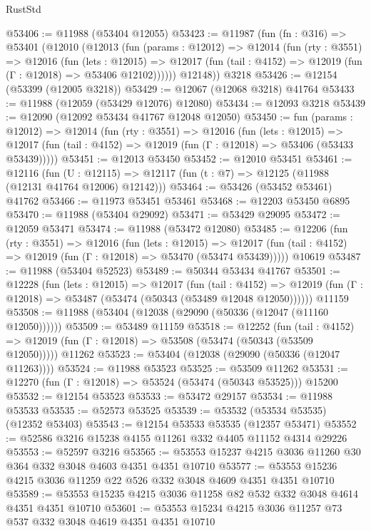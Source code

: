 \begin{lexlean}{RustStd}
\begin{coremodule}
@53406 := @11988 (@53404 @12055)
@53423 := @11987
    (fun (fn : @316) =>
    @53401
      (@12010
        (@12013
          (fun (params : @12012) =>
          @12014
            (fun (rty : @3551) =>
            @12016
              (fun (lets : @12015) =>
              @12017 (fun (tail : @4152) => @12019 (fun (Γ : @12018) => @53406 @12102))))))
        @12148))
    @3218
@53426 := @12154 (@53399 (@12005 @3218))
@53429 := @12067 (@12068 @3218) @41764
@53433 := @11988 (@12059 (@53429 @12076) @12080)
@53434 := @12093 @3218
@53439 := @12090 (@12092 @53434 @41767 @12048 @12050)
@53450 := fun (params : @12012) =>
  @12014
    (fun (rty : @3551) =>
    @12016
      (fun (lets : @12015) =>
      @12017 (fun (tail : @4152) => @12019 (fun (Γ : @12018) => @53406 (@53433 @53439)))))
@53451 := @12013 @53450
@53452 := @12010 @53451
@53461 := @12116
    (fun (U : @12115) => @12117 (fun (t : @7) => @12125 (@11988 (@12131 @41764 @12006) @12142)))
@53464 := @53426 (@53452 @53461) @41762
@53466 := @11973 @53451 @53461
@53468 := @12203 @53450 @6895
@53470 := @11988 (@53404 @29092)
@53471 := @53429 @29095
@53472 := @12059 @53471
@53474 := @11988 (@53472 @12080)
@53485 := @12206
    (fun (rty : @3551) =>
    @12016
      (fun (lets : @12015) =>
      @12017 (fun (tail : @4152) => @12019 (fun (Γ : @12018) => @53470 (@53474 @53439)))))
    @10619
@53487 := @11988 (@53404 @52523)
@53489 := @50344 @53434 @41767
@53501 := @12228
    (fun (lets : @12015) =>
    @12017
      (fun (tail : @4152) =>
      @12019 (fun (Γ : @12018) => @53487 (@53474 (@50343 (@53489 @12048 @12050))))))
    @11159
@53508 := @11988 (@53404 (@12038 (@29090 (@50336 (@12047 (@11160 @12050))))))
@53509 := @53489 @11159
@53518 := @12252
    (fun (tail : @4152) => @12019 (fun (Γ : @12018) => @53508 (@53474 (@50343 (@53509 @12050)))))
    @11262
@53523 := @53404 (@12038 (@29090 (@50336 (@12047 @11263))))
@53524 := @11988 @53523
@53525 := @53509 @11262
@53531 := @12270 (fun (Γ : @12018) => @53524 (@53474 (@50343 @53525))) @15200
@53532 := @12154 @53523
@53533 := @53472 @29157
@53534 := @11988 @53533
@53535 := @52573 @53525
@53539 := @53532 (@53534 @53535) (@12352 @53403)
@53543 := @12154 @53533 @53535 (@12357 @53471)
@53552 := @52586 @3216 @15238 @4155 @11261 @332 @4405 @11152 @4314 @29226
@53553 := @52597 @3216
@53565 := @53553 @15237 @4215 @3036 @11260 @30 @364 @332 @3048 @4603 @4351 @4351 @10710
@53577 := @53553 @15236 @4215 @3036 @11259 @22 @526 @332 @3048 @4609 @4351 @4351 @10710
@53589 := @53553 @15235 @4215 @3036 @11258 @82 @532 @332 @3048 @4614 @4351 @4351 @10710
@53601 := @53553 @15234 @4215 @3036 @11257 @73 @537 @332 @3048 @4619 @4351 @4351 @10710

\end{coremodule}
\end{lexlean}
